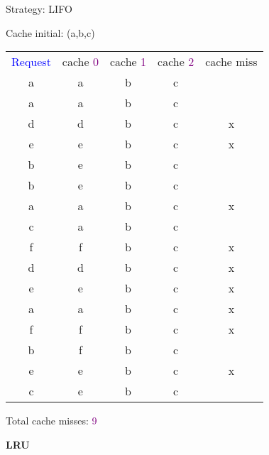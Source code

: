 \begin{tcolorbox}
{
Strategy: LIFO

\vspace{\baselineskip}

Cache initial: (a,b,c)

\vspace{\baselineskip}
\begin{tabular}{*{5}{c}}
\textcolor{Blue}{Request} & cache \textcolor{Purple}{0} & cache \textcolor{Purple}{1} & cache \textcolor{Purple}{2} & cache miss \\
a & a & b & c & \ \\
a & a & b & c & \ \\
d & d & b & c & x \\
e & e & b & c & x \\
b & e & b & c & \ \\
b & e & b & c & \ \\
a & a & b & c & x \\
c & a & b & c & \ \\
f & f & b & c & x \\
d & d & b & c & x \\
e & e & b & c & x \\
a & a & b & c & x \\
f & f & b & c & x \\
b & f & b & c & \ \\
e & e & b & c & x \\
c & e & b & c & \ \\
\end{tabular}

\vspace{\baselineskip}

Total cache misses: \textcolor{Purple}{9}}
\end{tcolorbox}

\vspace{\baselineskip}

\textbf{LRU}

